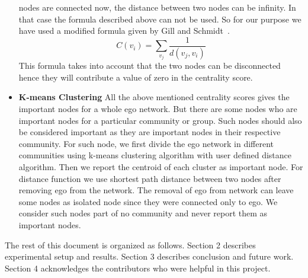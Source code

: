 \begin{itemize}
nodes are connected now, the distance between two nodes can be
infinity.  In that case the formula described above can not be used.
So for our purpose we have used a modified formula given by Gill and
Schmidt~\cite{gilandschmidt1996}.
$$C(v_i)= \sum_{v_j}\frac{1}{d(v_j,v_i)}$$
This formula takes into account that the two nodes can be disconnected
hence they will contribute a value of zero in the centrality score.
\item
\textbf{K-means Clustering}
All the above mentioned centrality scores gives the important nodes
for a whole ego network.  But there are some nodes who are important
nodes for a particular community or group.  Such nodes should also be
considered important as they are important nodes in their respective
community.  For such node, we first divide the ego network in
different communities using k-means clustering algorithm with user
defined distance algorithm.  Then we report the centroid of each
cluster as important node.  For distance function we use shortest path
distance between two nodes after removing ego from the network.  The
removal of ego from network can leave some nodes as isolated node
since they were connected only to ego.  We consider such nodes part of
no community and never report them as important nodes.
\end{itemize}

The rest of this document is organized as follows.  Section 2
describes experimental setup and results.  Section 3 describes
conclusion and future work.  Section 4 acknowledges the contributors
who were helpful in this project.

